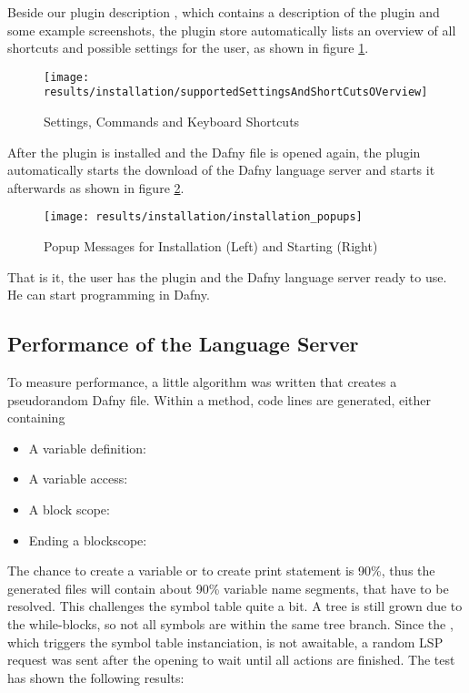 Beside our plugin description \cite{our-dafny-plugin},
which contains a description of the plugin and some example screenshots,
the plugin store automatically lists an overview of all shortcuts and possible settings for the user,
as shown in figure \ref{fig:supportedSettingsAndShortCutsOVerview}.

\begin{figure}[H]
    \centering
    \texttt{[image: results/installation/supportedSettingsAndShortCutsOVerview]}
    \caption{Settings, Commands and Keyboard Shortcuts}
    \label{fig:supportedSettingsAndShortCutsOVerview}
\end{figure}

After the plugin is installed and the Dafny file is opened again,
the plugin automatically starts the download of the Dafny language server and
starts it afterwards as shown in figure \ref{fig:installation_popups}.

\begin{figure}[H]
    \centering
    \texttt{[image: results/installation/installation\_popups]}
    \caption{Popup Messages for Installation (Left) and Starting (Right)}
    \label{fig:installation_popups}
\end{figure}

That is it, the user has the plugin and the Dafny language server ready to use.
He can start programming in Dafny.

\subsection{Performance of the Language Server}
To measure performance, a little algorithm was written that creates a pseudorandom Dafny file.
Within a method, code lines are generated, either containing
\begin{itemize}
    \item A variable definition: 
    \item A variable access: 
    \item A block scope: 
    \item Ending a blockscope: \code{\}}
\end{itemize}
The chance to create a variable or to create print statement is 90\%, thus the generated files will contain about 90\% variable name segments, that have to be resolved.
This challenges the symbol table quite a bit.
A tree is still grown due to the while-blocks, so not all symbols are within the same tree branch.
Since the , which triggers the symbol table instanciation, is not awaitable, a random LSP request was sent after the opening to wait until all actions are finished.
The test has shown the following results:

